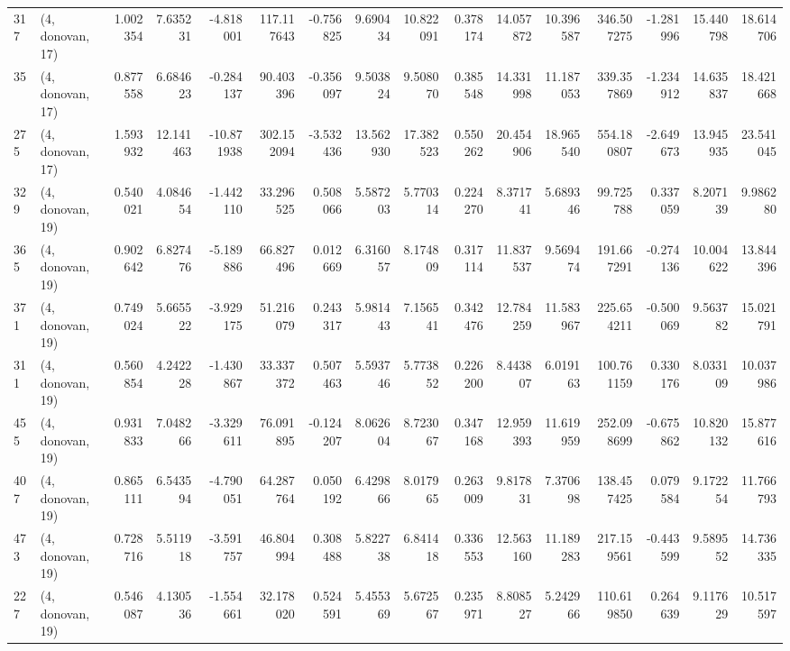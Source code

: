 \begin{tabular}{llrrrrrrrrrrrrrr}
317 &  (4, donovan, 17) &   1.002354 &   7.635231 &  -4.818001 &   117.117643 &  -0.756825 &   9.690434 &  10.822091 &  0.378174 &  14.057872 &  10.396587 &   346.507275 & -1.281996 &  15.440798 &  18.614706 \\
35  &  (4, donovan, 17) &   0.877558 &   6.684623 &  -0.284137 &    90.403396 &  -0.356097 &   9.503824 &   9.508070 &  0.385548 &  14.331998 &  11.187053 &   339.357869 & -1.234912 &  14.635837 &  18.421668 \\
275 &  (4, donovan, 17) &   1.593932 &  12.141463 & -10.871938 &   302.152094 &  -3.532436 &  13.562930 &  17.382523 &  0.550262 &  20.454906 &  18.965540 &   554.180807 & -2.649673 &  13.945935 &  23.541045 \\
329 &  (4, donovan, 19) &   0.540021 &   4.084654 &  -1.442110 &    33.296525 &   0.508066 &   5.587203 &   5.770314 &  0.224270 &   8.371741 &   5.689346 &    99.725788 &  0.337059 &   8.207139 &   9.986280 \\
365 &  (4, donovan, 19) &   0.902642 &   6.827476 &  -5.189886 &    66.827496 &   0.012669 &   6.316057 &   8.174809 &  0.317114 &  11.837537 &   9.569474 &   191.667291 & -0.274136 &  10.004622 &  13.844396 \\
371 &  (4, donovan, 19) &   0.749024 &   5.665522 &  -3.929175 &    51.216079 &   0.243317 &   5.981443 &   7.156541 &  0.342476 &  12.784259 &  11.583967 &   225.654211 & -0.500069 &   9.563782 &  15.021791 \\
311 &  (4, donovan, 19) &   0.560854 &   4.242228 &  -1.430867 &    33.337372 &   0.507463 &   5.593746 &   5.773852 &  0.226200 &   8.443807 &   6.019163 &   100.761159 &  0.330176 &   8.033109 &  10.037986 \\
455 &  (4, donovan, 19) &   0.931833 &   7.048266 &  -3.329611 &    76.091895 &  -0.124207 &   8.062604 &   8.723067 &  0.347168 &  12.959393 &  11.619959 &   252.098699 & -0.675862 &  10.820132 &  15.877616 \\
407 &  (4, donovan, 19) &   0.865111 &   6.543594 &  -4.790051 &    64.287764 &   0.050192 &   6.429866 &   8.017965 &  0.263009 &   9.817831 &   7.370698 &   138.457425 &  0.079584 &   9.172254 &  11.766793 \\
473 &  (4, donovan, 19) &   0.728716 &   5.511918 &  -3.591757 &    46.804994 &   0.308488 &   5.822738 &   6.841418 &  0.336553 &  12.563160 &  11.189283 &   217.159561 & -0.443599 &   9.589552 &  14.736335 \\
227 &  (4, donovan, 19) &   0.546087 &   4.130536 &  -1.554661 &    32.178020 &   0.524591 &   5.455369 &   5.672567 &  0.235971 &   8.808527 &   5.242966 &   110.619850 &  0.264639 &   9.117629 &  10.517597 \\

\end{tabular}
